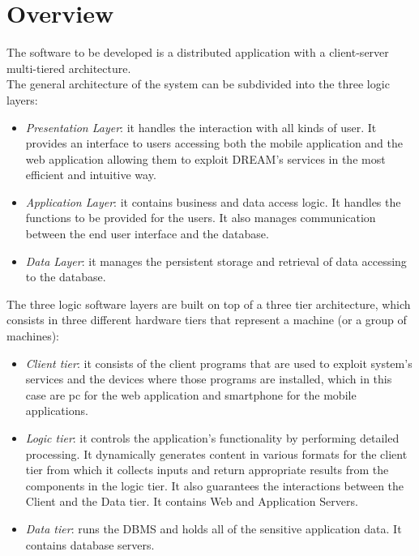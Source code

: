 \section{Overview}

The software to be developed is a distributed application with a client-server multi-tiered architecture. \\
The general architecture of the system can be subdivided into the three logic layers:
\begin{itemize}
    \item \textit{Presentation Layer}: it handles the interaction with all kinds of user. It provides an interface to users accessing both the mobile application and the web application allowing them to exploit DREAM’s services in the most efficient and intuitive way. 
    \item \textit{Application Layer}: it contains business and data access logic. It handles the functions to be provided for the users. It also manages communication between the end user interface and the database. 
    \item \textit{Data Layer}: it manages the persistent storage and retrieval of data accessing to the database. 
\end{itemize}

The three logic software layers are built on top of a three tier architecture, which consists in three different hardware tiers that represent a machine (or a group of machines):
\begin{itemize}
    \item \textit{Client tier}: it consists of the client programs that are used to exploit system’s services and the devices where those programs are installed, which in this case are pc for the web application and smartphone for the mobile applications.
    \item \textit{Logic tier}: it controls the application’s functionality by performing detailed processing. It dynamically generates content in various formats for the client tier from which it collects inputs and return appropriate results from the components in the logic tier.
    It also guarantees the interactions between the Client and the Data tier. It contains Web and Application Servers.
    
    \item \textit{Data tier}: runs the DBMS and holds all of the sensitive application data. It contains database servers.
\end{itemize}

